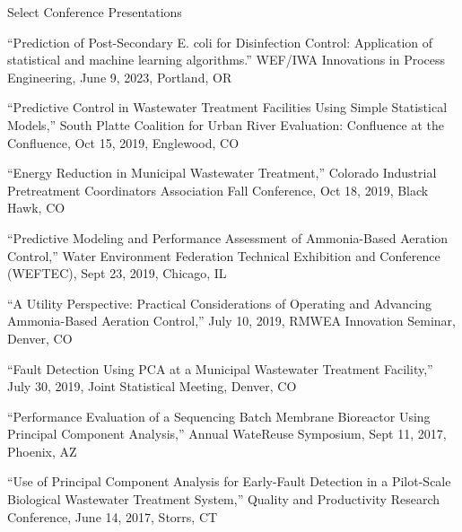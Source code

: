 \documentclass{resume} %
\begin{document}
\begin{rSection}{Select Conference Presentations}

``Prediction of Post-Secondary E. coli for Disinfection Control: Application of statistical and machine learning algorithms.'' WEF/IWA Innovations in Process Engineering, June 9, 2023, Portland, OR

``Predictive Control in Wastewater Treatment Facilities Using Simple Statistical Models,'' South Platte Coalition for Urban River Evaluation: Confluence at the Confluence, Oct 15, 2019, Englewood, CO

``Energy Reduction in Municipal Wastewater Treatment,'' Colorado Industrial Pretreatment Coordinators Association Fall Conference, Oct 18, 2019, Black Hawk, CO

%
``Predictive Modeling and Performance Assessment of Ammonia-Based Aeration Control,'' Water Environment Federation Technical Exhibition and Conference (WEFTEC), Sept 23, 2019, Chicago, IL

``A Utility Perspective: Practical Considerations of Operating and Advancing Ammonia-Based Aeration Control,'' July 10, 2019, RMWEA Innovation Seminar, Denver, CO

``Fault Detection Using PCA at a Municipal Wastewater Treatment Facility,'' July 30, 2019, Joint Statistical Meeting, Denver, CO

%
%
%
%
“Performance Evaluation of a Sequencing Batch Membrane Bioreactor Using Principal Component Analysis,” Annual WateReuse Symposium, Sept 11, 2017, Phoenix, AZ

“Use of Principal Component Analysis for Early-Fault Detection in a Pilot-Scale Biological Wastewater Treatment System,” Quality and Productivity Research Conference, June 14, 2017, Storrs, CT

%
%
\end{rSection}
\end{document}
